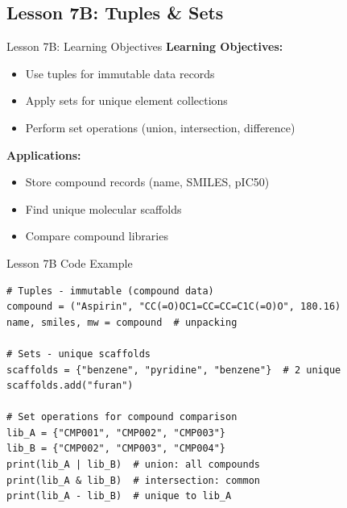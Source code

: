 \documentclass{beamer}
\begin{document}
\subsection{Lesson 7B: Tuples \& Sets}

\begin{frame}{Lesson 7B: Learning Objectives}
    \small
    \textbf{Learning Objectives:}
    \begin{itemize}
        \item Use tuples for immutable data records
        \item Apply sets for unique element collections
        \item Perform set operations (union, intersection, difference)
    \end{itemize}
    \vspace{0.5em}
    \textbf{Applications:}
    \begin{itemize}
        \item Store compound records (name, SMILES, pIC50)
        \item Find unique molecular scaffolds
        \item Compare compound libraries
    \end{itemize}
\end{frame}

\begin{frame}[fragile]{Lesson 7B Code Example}
    \small
    \begin{lstlisting}[style=codeStyle]
# Tuples - immutable (compound data)
compound = ("Aspirin", "CC(=O)OC1=CC=CC=C1C(=O)O", 180.16)
name, smiles, mw = compound  # unpacking

# Sets - unique scaffolds
scaffolds = {"benzene", "pyridine", "benzene"}  # 2 unique
scaffolds.add("furan")

# Set operations for compound comparison
lib_A = {"CMP001", "CMP002", "CMP003"}
lib_B = {"CMP002", "CMP003", "CMP004"}
print(lib_A | lib_B)  # union: all compounds
print(lib_A & lib_B)  # intersection: common
print(lib_A - lib_B)  # unique to lib_A
    \end{lstlisting}
\end{frame}
\end{document}
